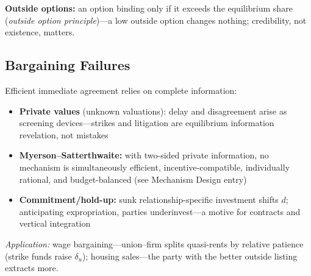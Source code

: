 \textbf{Outside options:} an option binding only if it exceeds the equilibrium share (\textit{outside option principle})---a low outside option changes nothing; credibility, not existence, matters.

\subsection{Bargaining Failures}
Efficient immediate agreement relies on complete information:
\begin{itemize}[nosep]
    \item \textbf{Private values} (unknown valuations): delay and disagreement arise as screening devices---strikes and litigation are equilibrium information revelation, not mistakes
    \item \textbf{Myerson--Satterthwaite:} with two-sided private information, no mechanism is simultaneously efficient, incentive-compatible, individually rational, and budget-balanced (see Mechanism Design entry)
    \item \textbf{Commitment/hold-up:} sunk relationship-specific investment shifts \(d\); anticipating expropriation, parties underinvest---a motive for contracts and vertical integration
\end{itemize}

\textit{Application:} wage bargaining---union--firm splits quasi-rents by relative patience (strike funds raise \(\delta_u\)); housing sales---the party with the better outside listing extracts more.
